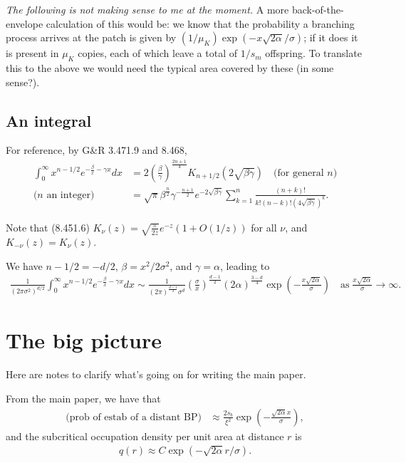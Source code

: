 \documentclass{article}
\begin{document}
\emph{The following is not making sense to me at the moment.} A more back-of-the-envelope calculation of this would be:
we know that the probability a branching process arrives at the patch is given by $(1/\mu_K)\exp(-x\sqrt{2 \alpha}/\sigma)$;
if it does it is present in $\mu_K$ copies, each of which leave a total of $1/s_m$ offspring.
To translate this to the above we would need the typical area covered by these (in some sense?).

\subsection{An integral}

For reference, by G\&R 3.471.9 and 8.468,
\begin{align}
  \int_0^\infty x^{n-1/2} e^{-\frac{\beta}{x}-\gamma x} dx &= 2 \left( \frac{\beta}{\gamma} \right)^{\frac{2n+1}{4}} K_{n+1/2}(2\sqrt{\beta\gamma}) \quad \mbox{(for general $n$)} \\
  \mbox{($n$ an integer)} \quad &= \sqrt{\pi} \beta^{\frac{n}{2}} \gamma^{-\frac{n+1}{2}} e^{-2\sqrt{\beta\gamma}} \sum_{k=1}^n \frac{ (n+k)! }{ k! (n-k)! (4\sqrt{\beta \gamma})^k } .
\end{align}

Note that (8.451.6) $K_\nu(z) = \sqrt{\frac{\pi}{2z}} e^{-z} (1 + O(1/z))$ for all $\nu$, and $K_{-\nu}(z)=K_\nu(z)$.

We have $n-1/2 = - d/2$, $\beta=x^2/2\sigma^2$, and $\gamma = \alpha$, leading to
\begin{align}
\frac{1}{(2\pi\sigma^2 )^{d/2}} \int_0^\infty x^{n-1/2} e^{-\frac{\beta}{x}-\gamma x} dx \sim
\frac{ 1 }{ (2\pi)^\frac{d-1}{2} \sigma^d } \left( \frac{\sigma}{x} \right)^{\frac{d-1}{2}} ({2\alpha})^\frac{3-d}{4} \exp\left( - \frac{ x \sqrt{2 \alpha} }{ \sigma } \right) \quad \mbox{as}\; \frac{x\sqrt{2\alpha}}{\sigma} \to \infty .
\end{align}

\section{The big picture}

Here are notes to clarify what's going on for writing the main paper.

From the main paper, we have that
\begin{align} \label{eqn:bp_prob_estab}
    \text{(prob of estab of a distant BP)} &\approx \frac{2s_b}{\xi^2} \exp\left( - \frac{\sqrt{2 \alpha} x}{\sigma} \right) ,
\end{align}
and the subcritical occupation density per unit area at distance $r$ is
\begin{align} \label{eqn:eqfreq}
    q(r) \approx C \exp( -\sqrt{2 \alpha} r / \sigma).
\end{align}
\end{document}
